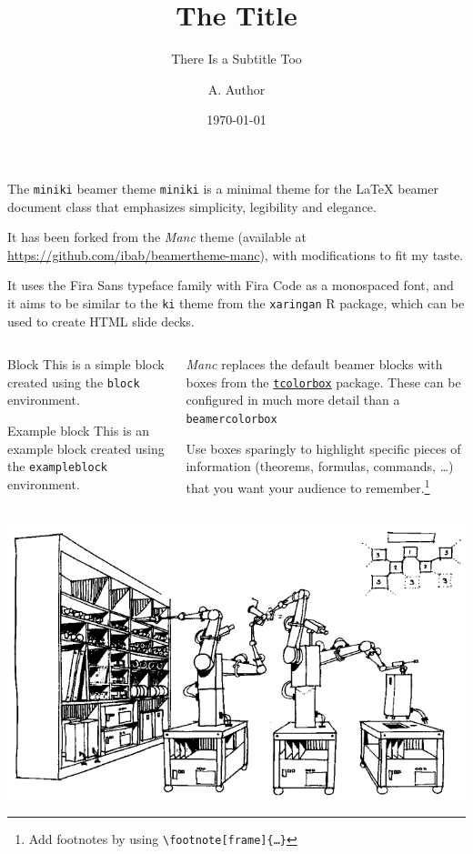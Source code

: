 \documentclass{beamer}
\title{The Title}
\subtitle{There Is a Subtitle Too}
\date{\today}
\author{A. Author}
\institute{Institute}
\begin{document}
\begin{frame}
	\titlepage
\end{frame}

\begin{frame}{The \texttt{miniki} beamer theme}
	\texttt{miniki} is a minimal theme for the \LaTeX{} beamer document class that emphasizes simplicity, legibility and elegance.

	It has been forked from the \emph{Manc} theme (available at \url{https://github.com/ibab/beamertheme-manc}), with modifications to fit my taste.

	It uses the Fira Sans typeface family with Fira Code as a monospaced font, and it aims to be similar to the \texttt{ki} theme from the \texttt{xaringan} R package, which can be used to create HTML slide decks.
\end{frame}

\begin{frame}[fragile]
	\begin{columns}
		\begin{column}{0.5\textwidth}
			\begin{block}{Block}
				This is a simple block created using the \texttt{block} environment.
			\end{block}
			\begin{exampleblock}{Example block}
				This is an example block created using the \texttt{exampleblock} environment.
			\end{exampleblock}
		\end{column}
		\begin{column}{0.5\textwidth}
			\emph{Manc} replaces the default beamer blocks with boxes from the \href{https://www.ctan.org/pkg/tcolorbox}{\texttt{tcolorbox}} package.
			These can be configured in much more detail than a \texttt{beamercolorbox}
			\medskip

			Use boxes sparingly to highlight specific pieces of information (theorems, formulas, commands, …) that you want your audience to remember.\footnote[frame]{Add footnotes by using \texttt{\backslash footnote[frame]\{…\}}}
		\end{column}
	\end{columns}
\end{frame}

\begin{frame}
	\centering
	\includegraphics[width = \textwidth]{./graphics/self-replicating.png}
\end{frame}
\end{document}
